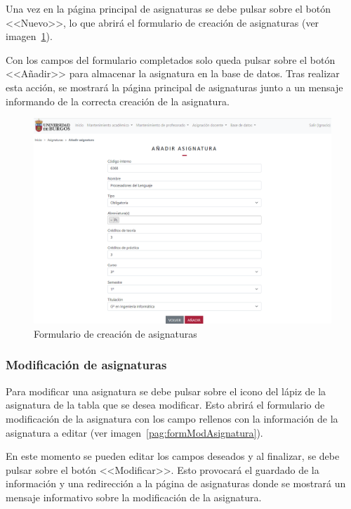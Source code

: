 Una vez en la página principal de asignaturas se debe pulsar sobre el botón <<Nuevo>>, lo que abrirá el formulario de creación de asignaturas (ver imagen~\ref{pag:formAsignatura}).

Con los campos del formulario completados solo queda pulsar sobre el botón <<Añadir>> para almacenar la asignatura en la base de datos.
Tras realizar esta acción, se mostrará la página principal de asignaturas junto a un mensaje informando de la correcta creación de la asignatura.

\begin{figure}
	\centering
	\includegraphics[width=\textwidth]{../img/Anexos/Manual usuario/formAsignatura.png}
	\caption{Formulario de creación de asignaturas}\label{pag:formAsignatura}
\end{figure}

\subsubsection{Modificación de asignaturas}
Para modificar una asignatura se debe pulsar sobre el icono del lápiz de la asignatura de la tabla que se desea modificar.
Esto abrirá el formulario de modificación de la asignatura con los campo rellenos con la información de la asignatura a editar (ver imagen~\ref{pag:formModAsignatura}).

En este momento se pueden editar los campos deseados y al finalizar, se debe pulsar sobre el botón <<Modificar>>.
Esto provocará el guardado de la información y una redirección a la página de asignaturas donde se mostrará un mensaje informativo sobre la modificación de la asignatura.

